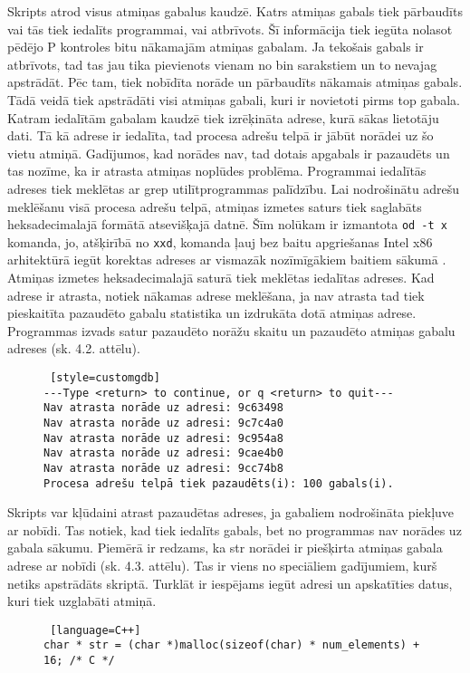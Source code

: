 Skripts atrod visus atmiņas gabalus kaudzē. 
Katrs atmiņas gabals tiek pārbaudīts vai tās tiek iedalīts programmai, vai atbrīvots.
Šī informācija tiek iegūta nolasot pēdējo P kontroles bitu nākamajām atmiņas gabalam.
Ja tekošais gabals ir atbrīvots, tad tas jau tika pievienots vienam no bin sarakstiem un to nevajag apstrādāt.
Pēc tam, tiek nobīdīta norāde un pārbaudīts nākamais atmiņas gabals.
Tādā veidā tiek apstrādāti visi atmiņas gabali, kuri ir novietoti pirms top gabala.
Katram iedalītām gabalam kaudzē tiek izrēķināta adrese, kurā sākas lietotāju dati.
Tā kā adrese ir iedalīta, tad procesa adrešu telpā ir jābūt norādei uz šo vietu atmiņā.
Gadījumos, kad norādes nav, tad dotais apgabals ir pazaudēts un tas nozīme, ka ir atrasta atmiņas noplūdes problēma.
Programmai iedalītās adreses tiek meklētas ar grep utilītprogrammas palīdzību.
Lai nodrošinātu adrešu meklēšanu visā procesa adrešu telpā, atmiņas izmetes saturs tiek saglabāts heksadecimalajā formātā atsevišķajā datnē.
Šīm nolūkam ir izmantota \texttt{od -t x} komanda, jo, atšķirībā no \texttt{xxd}, komanda ļauj bez baitu apgriešanas Intel x86 arhitektūrā iegūt korektas adreses ar  vismazāk nozīmīgākiem baitiem sākumā \cite{DPT}.
Atmiņas izmetes heksadecimalajā saturā tiek meklētas iedalītas adreses.
Kad adrese ir atrasta, notiek nākamas adrese meklēšana, ja nav atrasta tad tiek pieskaitīta pazaudēto gabalu statistika un izdrukāta dotā atmiņas adrese.
Programmas izvads satur pazaudēto norāžu skaitu un pazaudēto atmiņas gabalu adreses (sk. 4.2. attēlu).



\begin{figure}[h]
\begin{lstlisting} [style=customgdb]
---Type <return> to continue, or q <return> to quit---
Nav atrasta norāde uz adresi: 9c63498
Nav atrasta norāde uz adresi: 9c7c4a0
Nav atrasta norāde uz adresi: 9c954a8
Nav atrasta norāde uz adresi: 9cae4b0
Nav atrasta norāde uz adresi: 9cc74b8
Procesa adrešu telpā tiek pazaudēts(i): 100 gabals(i).
\end{lstlisting}
\caption{\textbf{\fontsize{11}{12}\selectfont {Atmiņas noplūdes atrašana, gdb skripta izvads}}}
\end{figure} %

Skripts var kļūdaini atrast pazaudētas adreses, ja gabaliem nodrošināta piekļuve ar nobīdi.
Tas notiek, kad tiek iedalīts gabals, bet no programmas nav norādes uz gabala sākumu.
Piemērā ir redzams, ka str norādei ir piešķirta atmiņas gabala adrese ar nobīdi (sk. 4.3. attēlu).
Tas ir viens no speciāliem gadījumiem, kurš netiks apstrādāts skriptā. 
Turklāt ir iespējams iegūt adresi un apskatīties datus, kuri tiek uzglabāti atmiņā.
\begin{figure}[h]
\begin{lstlisting} [language=C++]
char * str = (char *)malloc(sizeof(char) * num_elements) + 16; /* C */
\end{lstlisting}
\caption{\textbf{\fontsize{11}{12}\selectfont {Speciālgadījums, no procesa adrešu telpā nav norādes uz gabala sākumu}}}
\end{figure}

